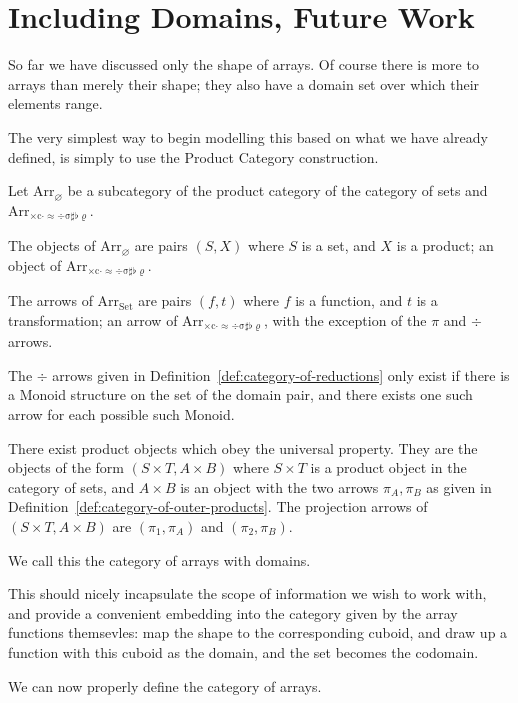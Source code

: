 \documentclass{DIKU-report-variant}
\newcommand\mrm[1]{\mathrm{#1}}
\newcommand\brm[1]{\bm{\mrm{#1}}}
\newcommand\Arr[1]{{\brm{Arr}_{\brm{#1}}}}
\newcommand\XCADSSFR{\times c\cdot\approx\div\sigma\sharp\flat\varrho}
\begin{document}
\section{Including Domains, Future Work}

So far we have discussed only the shape of arrays. Of course there is more to
arrays than merely their shape; they also have a domain set over which their elements
range.

The very simplest way to begin modelling this based on what we have already defined,
is simply to use the Product Category construction.

\begin{definition}
  \label{def:cateogry-of-arrays-with-domains}
  Let \(\Arr \varnothing\) be a subcategory of the product category of
  the category of sets and \(\Arr\XCADSSFR\).

  The objects of \(\Arr\varnothing\) are pairs \((S, X)\) where \(S\) is a set,
  and \(X\) is a product; an object of \(\Arr\XCADSSFR\).

  The arrows of \(\Arr{\brm{Set}}\) are pairs \((f, t)\) where \(f\) is a function,
  and \(t\) is a transformation; an arrow of \(\Arr\XCADSSFR\), with the exception
  of the \(\pi\) and \(\div\) arrows.
  
  The \(\div\) arrows given in Definition~\ref{def:category-of-reductions} only exist
  if there is a Monoid structure on the set of the domain pair, and there exists one
  such arrow for each possible such Monoid.

  There exist product objects which obey the universal property. They are the objects
  of the form \((S \times T, A \times B)\) where \(S\times T\) is a product object in
  the category of sets, and \(A \times B\) is an object with the two arrows \(\pi_A, \pi_B\)
  as given in Definition~\ref{def:category-of-outer-products}. The projection arrows of
  \((S\times T, A\times B)\)  are \((\pi_1, \pi_A)\) and \((\pi_2, \pi_B)\).

  We call this the category of arrays with domains.
\end{definition}

This should nicely incapsulate the scope of information we wish to work with, and provide
a convenient embedding into the category given by the array functions themsevles: map
the shape to the corresponding cuboid, and draw up a function with this cuboid as the
domain, and the set becomes the codomain.

We can now properly define the category of arrays.
\end{document}
